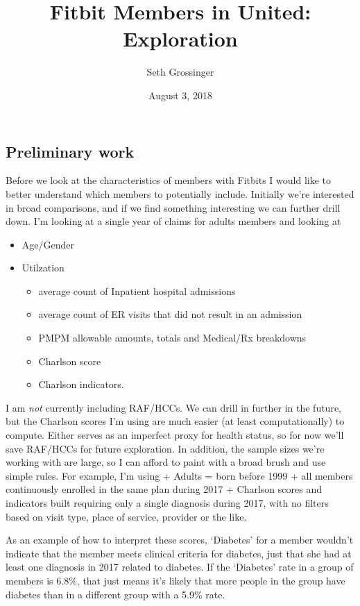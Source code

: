 \documentclass[]{article}
\title{Fitbit Members in United: Exploration}
\author{Seth Grossinger}
\date{August 3, 2018}
\providecommand{\tightlist}{%
  \setlength{\itemsep}{0pt}\setlength{\parskip}{0pt}}
\begin{document}
\maketitle

\subsection{Preliminary work}\label{preliminary-work}

Before we look at the characteristics of members with Fitbits I would
like to better understand which members to potentially include.
Initially we're interested in broad comparisons, and if we find
something interesting we can further drill down. I'm looking at a single
year of claims for adults members and looking at

\begin{itemize}
\tightlist
\item
  Age/Gender
\item
  Utilzation

  \begin{itemize}
  \tightlist
  \item
    average count of Inpatient hospital admissions
  \item
    average count of ER visits that did not result in an admission
  \item
    PMPM allowable amounts, totals and Medical/Rx breakdowns
  \item
    Charlson score
  \item
    Charlson indicators.
  \end{itemize}
\end{itemize}

I am \emph{not} currently including RAF/HCCs. We can drill in further in
the future, but the Charlson scores I'm using are much easier (at least
computationally) to compute. Either serves as an imperfect proxy for
health status, so for now we'll save RAF/HCCs for future exploration. In
addition, the sample sizes we're working with are large, so I can afford
to paint with a broad brush and use simple rules. For example, I'm using
+ Adults = born before 1999 + all members continuously enrolled in the
same plan during 2017 + Charlson scores and indicators built requiring
only a single diagnosis during 2017, with no filters based on visit
type, place of service, provider or the like.

As an example of how to interpret these scores, `Diabetes' for a member
wouldn't indicate that the member meets clinical criteria for diabetes,
just that she had at least one diagnosis in 2017 related to diabetes. If
the `Diabetes' rate in a group of members is 6.8\%, that just means it's
likely that more people in the group have diabetes than in a different
group with a 5.9\% rate.
\end{document}
